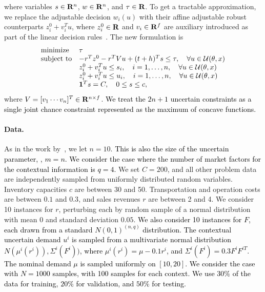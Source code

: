 \documentclass[11pt]{article}
\newcommand{\RC}[1]{\textcolor{black}{#1}}
\begin{document}
where variables $s\in {\mathbf R}^n$, $w\in {\mathbf R}^n$, and $\tau \in {\mathbf R}$. To get a tractable approximation, we replace the adjustable decision $w_i(u)$ with their affine adjustable robust counterparts $z^0_i + v_i^Tu$, where $z^0_i \in {\mathbf R}$ and $v_i \in {\mathbf R}^f$ are auxiliary introduced as part of the linear decision rules~\citep{ben-tal_robust_2009}. 
\ifpreprint The new formulation is
\RC{\begin{equation}
	\label{eq:inv_2}
	\begin{array}{ll}
		\mbox{minimize} & \tau\\
		\mbox{subject to} & -r^Tz^0 - r^TVu + (t+h)^Ts \le \tau, \quad \forall u\in {\mathcal{U}}(\theta,x)\\
		& z^0_i + v_i^Tu\leq s_i, \quad i = 1, \dots, n, \quad \forall u\in {\mathcal{U}}(\theta,x)\\
		& z^0_i + v_i^Tu \leq u_i, \quad i = 1, \dots, n, \quad \forall u\in {\mathcal{U}}(\theta,x)\\
			& \mathbf 1^Ts = C, \quad 0 \le s \leq c,\\
	\end{array}
\end{equation}}
where $V = [v_1 \cdots v_n]^T \in {\mathbf R}^{n \times f}$. 
\fi
\RC{We treat the $2n+1$ uncertain constraints as a single joint chance constraint represented as the maximum of concave functions.}

\paragraph{Data.} As in the work by~\cite{pareto}, we let $n = 10$. \RC{This is also the size of the uncertain parameter, \ie, $m=n$. We consider the case where the number of market factors for the contextual information is $q=4$.} We set $C = 200$, and all other problem data are independently sampled from uniformly distributed random variables. 
Inventory capacities $c$ are between 30 and 50. 
Transportation and operation costs are between $0.1$ and $0.3$, and sales revenues $r$ are between 2 and 4.
We consider 10 instances for $r$, perturbing each by random sample of a normal distribution with mean 0 and standard deviation $0.05$.
\RC{We also consider 10 instances for $F$, each drawn from a standard $N(0,1)^{(n,q)}$ distribution.} 
\RC{The contextual uncertain demand $u^i$ is sampled from a multivariate normal distribution $N(\mu^i(r^i)), \Sigma^i(F^i))$, where $\mu^i(r^i) = \mu -0.1r^i$, and $\Sigma^i(F^i) = 0.3F^iF^{iT}$. The nominal demand $\mu$ is sampled uniformly on $[10,20]$. 
We consider the case with $N=1000$ samples, with 100 samples for each context. We use $30\%$ of the data for training, $20\%$ for validation, and $50\%$ for testing.}
\end{document}
